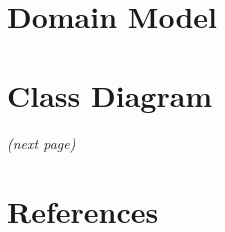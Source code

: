 \documentclass{article}
\begin{document}
\section{Domain Model}


\section{Class Diagram}
\textit{(next page)}


\section{References}


\end{document}
